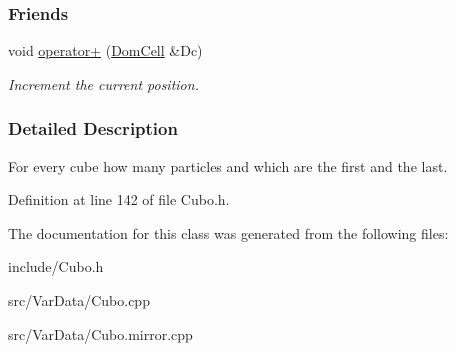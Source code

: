 \subsubsection*{\-Friends}
\begin{DoxyCompactItemize}
\item 
\hypertarget{classDomCell_adc7011bf2c3bed47a9bc11e42b1eea74}{void \hyperlink{classDomCell_adc7011bf2c3bed47a9bc11e42b1eea74}{operator+} (\hyperlink{classDomCell}{\-Dom\-Cell} \&\-Dc)}\label{classDomCell_adc7011bf2c3bed47a9bc11e42b1eea74}

\begin{DoxyCompactList}\small\item\em \-Increment the current position. \end{DoxyCompactList}\end{DoxyCompactItemize}


\subsubsection{\-Detailed \-Description}
\-For every cube how many particles and which are the first and the last. 

\-Definition at line 142 of file \-Cubo.\-h.



\-The documentation for this class was generated from the following files\-:\begin{DoxyCompactItemize}
\item 
include/\-Cubo.\-h\item 
src/\-Var\-Data/\-Cubo.\-cpp\item 
src/\-Var\-Data/\-Cubo.\-mirror.\-cpp\end{DoxyCompactItemize}
